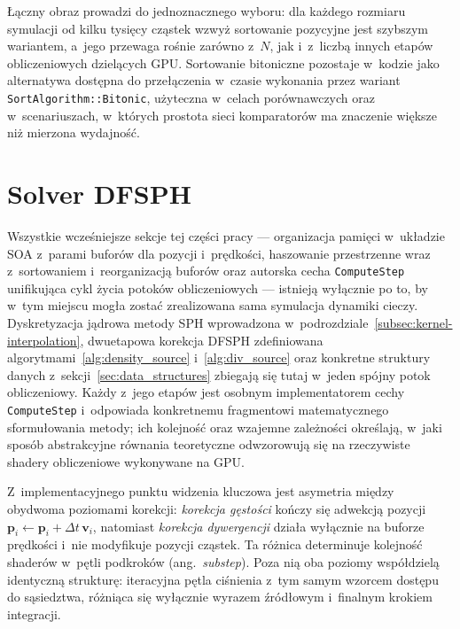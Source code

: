 Łączny obraz prowadzi do jednoznacznego wyboru: dla każdego rozmiaru symulacji
od kilku tysięcy cząstek wzwyż sortowanie pozycyjne jest szybszym wariantem, a~jego
przewaga rośnie zarówno z~$N$, jak i~z~liczbą innych etapów obliczeniowych
dzielących GPU. Sortowanie bitoniczne pozostaje w~kodzie jako alternatywa
dostępna do przełączenia w~czasie wykonania przez wariant
\texttt{SortAlgorithm::Bitonic}, użyteczna w~celach porównawczych oraz
w~scenariuszach, w~których prostota sieci komparatorów ma znaczenie większe
niż mierzona wydajność.

\section{Solver DFSPH}
\label{sec:dfsph}

Wszystkie wcześniejsze sekcje tej części pracy --- organizacja pamięci
w~układzie SOA z~parami buforów dla pozycji i~prędkości, haszowanie
przestrzenne wraz z~sortowaniem i~reorganizacją buforów oraz autorska
cecha \texttt{ComputeStep} unifikująca cykl życia potoków obliczeniowych
--- istnieją wyłącznie po to, by w~tym miejscu mogła zostać zrealizowana
sama symulacja dynamiki cieczy. Dyskretyzacja jądrowa metody SPH
wprowadzona w~podrozdziale~\ref{subsec:kernel-interpolation},
dwuetapowa korekcja DFSPH zdefiniowana algorytmami~\ref{alg:density_source}
i~\ref{alg:div_source} oraz konkretne struktury danych z~sekcji~\ref{sec:data_structures}
zbiegają się tutaj w~jeden spójny potok obliczeniowy. Każdy z~jego etapów
jest osobnym implementatorem cechy \texttt{ComputeStep} i~odpowiada
konkretnemu fragmentowi matematycznego sformułowania metody; ich kolejność
oraz wzajemne zależności określają, w~jaki sposób abstrakcyjne równania
teoretyczne odwzorowują się na rzeczywiste shadery obliczeniowe wykonywane
na GPU.

Z~implementacyjnego punktu widzenia kluczowa jest asymetria między obydwoma
poziomami korekcji: \textit{korekcja gęstości} kończy się adwekcją pozycji
$\mathbf{p}_i \leftarrow \mathbf{p}_i + \Delta t\,\mathbf{v}_i$,
natomiast \textit{korekcja dywergencji} działa wyłącznie na buforze
prędkości i~nie modyfikuje pozycji cząstek.
Ta różnica determinuje kolejność shaderów w~pętli podkroków (ang.~\textit{substep}).
Poza nią oba poziomy współdzielą identyczną strukturę: iteracyjna pętla
ciśnienia z~tym samym wzorcem dostępu do sąsiedztwa, różniąca się
wyłącznie wyrazem źródłowym i~finalnym krokiem integracji.

